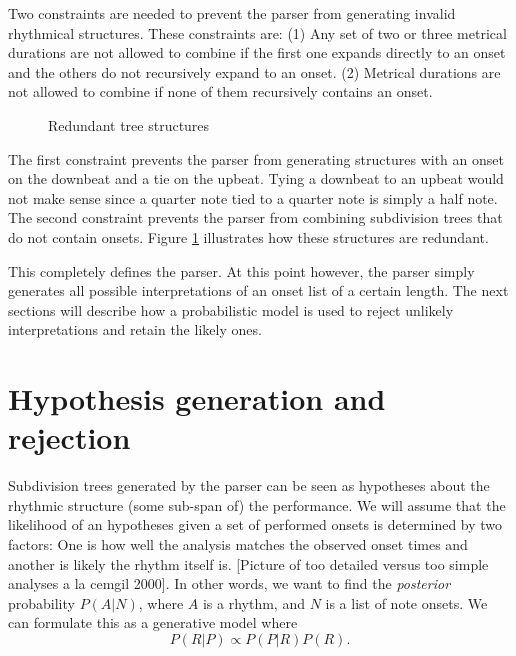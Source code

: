 Two constraints are needed to prevent the parser from generating invalid rhythmical structures. These constraints are: (1) Any set of two or three metrical durations are not allowed to combine if the first one expands directly to an onset and the others do not recursively expand to an onset. (2) Metrical durations are not allowed to combine if none of them recursively contains an onset.

\begin{figure}
\centering
{}
\qquad
{}
\caption{Redundant tree structures}
\label{fig:constraints}
\end{figure}

The first constraint prevents the parser from generating structures with an onset on the downbeat and a tie on the upbeat. Tying a downbeat to an upbeat would not make sense since a quarter note tied to a quarter note is simply a half note. The second constraint prevents the parser from combining subdivision trees that do not contain onsets. Figure \ref{fig:constraints} illustrates how these structures are redundant.


This completely defines the parser. At this point however, the parser simply generates all possible interpretations of an onset list of a certain length. The next sections will describe how a probabilistic model is used to reject unlikely interpretations and retain the likely ones.

\section{Hypothesis generation and rejection}
\label{sec:rejection}

Subdivision trees generated by the parser can be seen as hypotheses about the rhythmic structure (some sub-span of) the performance. We will assume that the likelihood of an hypotheses given a set of performed onsets is determined by two factors: One is how well the analysis matches the observed onset times and another is likely the rhythm itself is. [Picture of too detailed versus too simple analyses a la cemgil 2000]. In other words, we want to find the \textit{posterior} probability $P(A|N)$, where $A$ is a rhythm, and $N$ is a list of note onsets. We can formulate this as a generative model where
\begin{equation}
\label{eq:model}
P(R|P) \propto P(P|R)P(R).
\end{equation}

